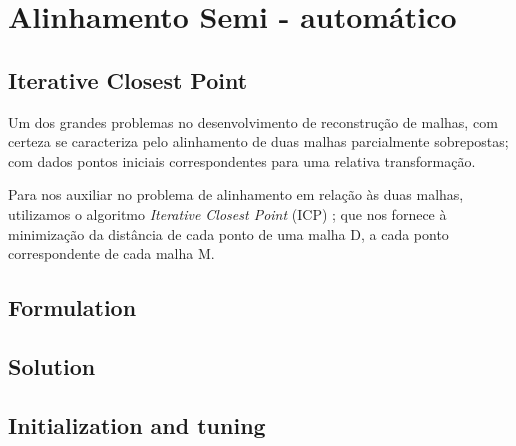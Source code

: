 \section{Alinhamento Semi - automático}
\label{sec:technique}

\subsection{Iterative Closest Point}

Um dos grandes problemas no desenvolvimento de reconstrução de malhas, com certeza se caracteriza pelo alinhamento de duas malhas parcialmente sobrepostas; com dados pontos iniciais correspondentes para uma relativa transformação.

Para nos auxiliar no problema de alinhamento em relação às duas malhas, utilizamos o algoritmo \textit{Iterative Closest Point} (ICP) \cite{Zhang:1994}; que nos fornece à minimização da distância de cada ponto de uma malha D, a cada ponto correspondente de cada malha M.
%


\subsection{Formulation}


\subsection{Solution}


\subsection{Initialization and tuning}
